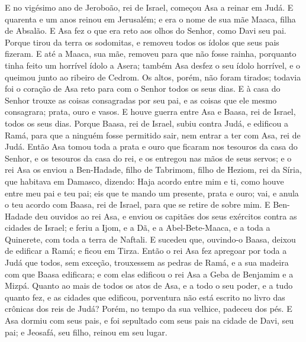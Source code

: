 E no vigésimo ano de Jeroboão, rei de Israel, começou Asa a reinar
em Judá. E quarenta e um anos reinou em Jerusalém; e era o
nome de sua mãe Maaca, filha de Absalão. E Asa fez o que era
reto aos olhos do Senhor, como Davi seu pai. Porque tirou da
terra os sodomitas, e removeu todos os ídolos que seus pais fizeram.
E até a Maaca, sua mãe, removeu para que não fosse rainha,
porquanto tinha feito um horrível ídolo a Asera; também Asa desfez o
seu ídolo horrível, e o queimou junto ao ribeiro de Cedrom.
Os altos, porém, não foram tirados; todavia foi o coração de
Asa reto para com o Senhor todos os seus dias. E à casa do
Senhor trouxe as coisas consagradas por seu pai, e as coisas que ele
mesmo consagrara; prata, ouro e vasos. E houve guerra entre
Asa e Baasa, rei de Israel, todos os seus dias. Porque Baasa,
rei de Israel, subiu contra Judá, e edificou a Ramá, para que a
ninguém fosse permitido sair, nem entrar a ter com Asa, rei de Judá.
Então Asa tomou toda a prata e ouro que ficaram nos tesouros
da casa do Senhor, e os tesouros da casa do rei, e os entregou nas
mãos de seus servos; e o rei Asa os enviou a Ben-Hadade, filho de
Tabrimom, filho de Heziom, rei da Síria, que habitava em Damasco,
dizendo: Haja acordo entre mim e ti, como houve entre meu pai
e teu pai; eis que te mando um presente, prata e ouro; vai, e anula
o teu acordo com Baasa, rei de Israel, para que se retire de sobre
mim. E Ben-Hadade deu ouvidos ao rei Asa, e enviou os
capitães dos seus exércitos contra as cidades de Israel; e feriu a
Ijom, e a Dã, e a Abel-Bete-Maaca, e a toda a Quinerete, com toda a
terra de Naftali. E sucedeu que, ouvindo-o Baasa, deixou de
edificar a Ramá; e ficou em Tirza. Então o rei Asa fez
apregoar por toda a Judá que todos, sem exceção, trouxessem as
pedras de Ramá, e a sua madeira com que Baasa edificara; e com elas
edificou o rei Asa a Geba de Benjamim e a Mizpá. Quanto ao
mais de todos os atos de Asa, e a todo o seu poder, e a tudo quanto
fez, e as cidades que edificou, porventura não está escrito no livro
das crônicas dos reis de Judá? Porém, no tempo da sua velhice,
padeceu dos pés. E Asa dormiu com seus pais, e foi sepultado
com seus pais na cidade de Davi, seu pai; e Jeosafá, seu filho,
reinou em seu lugar.


